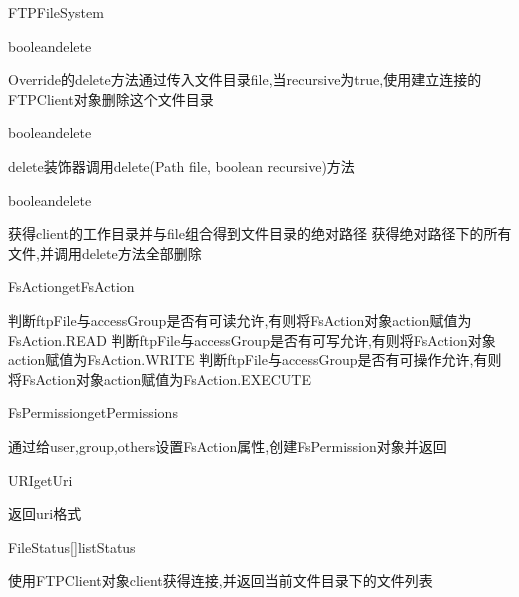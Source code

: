 \begin{XeClass}{FTPFileSystem}
    \begin{XeMethod}{\XePublic}{boolean}{delete}
         
 Override的delete方法通过传入文件目录file,当recursive为true,使用建立连接的FTPClient对象删除这个文件目录

    \end{XeMethod}

    \begin{XeMethod}{\XePrivate}{boolean}{delete}
         
 delete装饰器调用delete(Path file, boolean recursive)方法

    \end{XeMethod}

    \begin{XeMethod}{\XePrivate}{boolean}{delete}
         
 获得client的工作目录并与file组合得到文件目录的绝对路径
 获得绝对路径下的所有文件,并调用delete方法全部删除

    \end{XeMethod}

    \begin{XeMethod}{\XePrivate}{FsAction}{getFsAction}
         
 判断ftpFile与accessGroup是否有可读允许,有则将FsAction对象action赋值为FsAction.READ
 判断ftpFile与accessGroup是否有可写允许,有则将FsAction对象action赋值为FsAction.WRITE
 判断ftpFile与accessGroup是否有可操作允许,有则将FsAction对象action赋值为FsAction.EXECUTE

    \end{XeMethod}

    \begin{XeMethod}{\XePrivate}{FsPermission}{getPermissions}
         
 通过给user,group,others设置FsAction属性,创建FsPermission对象并返回

    \end{XeMethod}

    \begin{XeMethod}{\XePublic}{URI}{getUri}
         
 返回uri格式

    \end{XeMethod}

    \begin{XeMethod}{\XePublic}{FileStatus[]}{listStatus}
         
 使用FTPClient对象client获得连接,并返回当前文件目录下的文件列表

    \end{XeMethod}


\end{XeClass}

